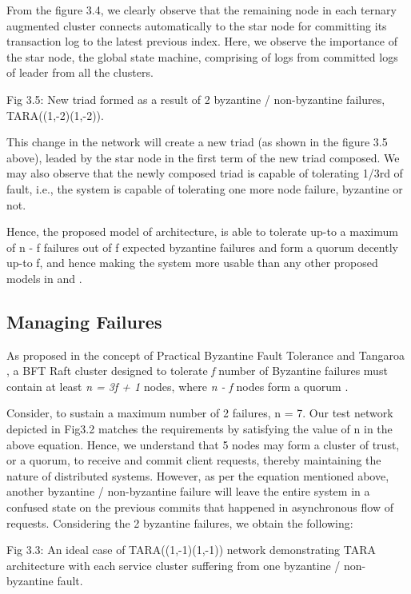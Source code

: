 \documentclass[]{article}
\begin{document}
From the figure 3.4, we clearly observe that the remaining node in each ternary augmented cluster connects automatically to the star node for committing its transaction log to the latest previous index. Here, we observe the importance of the star node, the global state machine, comprising of logs from committed logs of leader from all the clusters.


Fig 3.5: New triad formed as a result of 2 byzantine / non-byzantine failures, TARA((1,-2)(1,-2)).

This change in the network will create a new triad (as shown in the figure 3.5 above), leaded by the star node in the first term of the new triad composed. We may also observe that the newly composed triad is capable of tolerating 1/3rd of fault, i.e., the system is capable of tolerating one more node failure, byzantine or not.

Hence, the proposed model of architecture, is able to tolerate up-to a maximum of n - f failures out of f expected byzantine failures and form a quorum decently up-to f, and hence making the system more usable than any other proposed models in \cite{ARTICLE:1} and \cite{ARTICLE:3}.

\subsection{Managing Failures}

As proposed in the concept of Practical Byzantine Fault Tolerance \cite{ARTICLE:1} and Tangaroa \cite{ARTICLE:3} , a BFT Raft cluster designed to tolerate \textit{f} number of Byzantine failures must contain at least \textit{n = 3f + 1} nodes, where \textit{n - f} nodes form a quorum \cite{ARTICLE:3}.

Consider, to sustain a maximum number of 2 failures, n = 7. Our test network depicted in Fig3.2 matches the requirements by satisfying the value of n in the above equation. Hence, we understand that 5 nodes may form a cluster of trust, or a quorum, to receive and commit client requests, thereby maintaining the nature of distributed systems. However, as per the equation mentioned above, another byzantine / non-byzantine failure will leave the entire system in a confused state on the previous commits that happened in asynchronous flow of requests.
Considering the 2 byzantine failures, we obtain the following:

Fig 3.3: An ideal case of TARA((1,-1)(1,-1)) network demonstrating TARA architecture with each service cluster suffering from one byzantine / non-byzantine fault.
\end{document}
